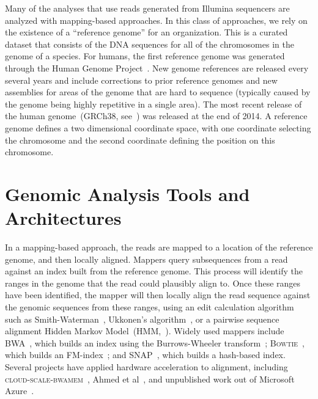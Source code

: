 \documentclass[phd]{ucbthesis}
\begin{document}
Many of the analyses that use reads generated from Illumina sequencers are
analyzed with mapping-based approaches. In this class of approaches, we rely on
the existence of a ``reference genome'' for an organization. This is a curated
dataset that consists of the DNA sequences for all of the chromosomes in the
genome of a species. For humans, the first reference genome was generated
through the Human Genome Project~\cite{lander01}. New genome references are
released every several years and include corrections to prior reference genomes
and new assemblies for areas of the genome that are hard to sequence (typically
caused by the genome being highly repetitive in a single area). The most recent
release of the human genome~(GRCh38, see~\cite{church15}) was released at the
end of 2014. A reference genome defines a two dimensional coordinate space, with
one coordinate selecting the chromosome and the second coordinate defining the
position on this chromosome.

\section{Genomic Analysis Tools and Architectures}
\label{sec:genomic-analysis}

In a mapping-based approach, the reads are mapped to a location of the reference
genome, and then locally aligned. Mappers query subsequences from a read against
an index built from the reference genome. This process will identify the ranges
in the genome that the read could plausibly align to. Once these ranges have
been identified, the mapper will then locally align the read sequence against
the genomic sequences from these ranges, using an edit calculation algorithm such
as Smith-Waterman~\cite{smith81}, Ukkonen's algorithm~\cite{ukkonen85}, or a
pairwise sequence alignment Hidden Markov Model~(HMM,~\cite{durbin98}). Widely
used mappers include \textsc{BWA}~\cite{li09}, which builds an index using the
Burrows-Wheeler transform~\cite{burrows94}; \textsc{Bowtie}~\cite{langmead09},
which builds an FM-index~\cite{ferragina00}; and \textsc{SNAP}~\cite{zaharia11},
which builds a hash-based index. Several projects have applied hardware acceleration
to alignment, including \textsc{cloud-scale-bwamem}~\cite{chen15, chen16}, Ahmed
et al~\cite{ahmed15}, and unpublished work out of Microsoft
Azure~\cite{msr16}.
\end{document}

